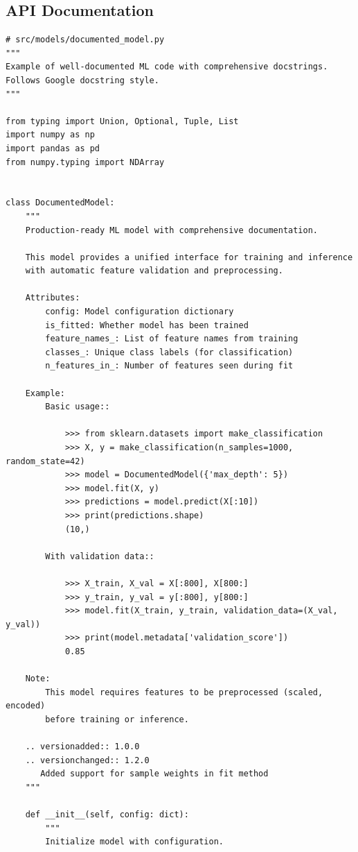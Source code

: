 \subsection{API Documentation}

\begin{lstlisting}[style=python, caption=Comprehensive docstring examples]
# src/models/documented_model.py
"""
Example of well-documented ML code with comprehensive docstrings.
Follows Google docstring style.
"""

from typing import Union, Optional, Tuple, List
import numpy as np
import pandas as pd
from numpy.typing import NDArray


class DocumentedModel:
    """
    Production-ready ML model with comprehensive documentation.

    This model provides a unified interface for training and inference
    with automatic feature validation and preprocessing.

    Attributes:
        config: Model configuration dictionary
        is_fitted: Whether model has been trained
        feature_names_: List of feature names from training
        classes_: Unique class labels (for classification)
        n_features_in_: Number of features seen during fit

    Example:
        Basic usage::

            >>> from sklearn.datasets import make_classification
            >>> X, y = make_classification(n_samples=1000, random_state=42)
            >>> model = DocumentedModel({'max_depth': 5})
            >>> model.fit(X, y)
            >>> predictions = model.predict(X[:10])
            >>> print(predictions.shape)
            (10,)

        With validation data::

            >>> X_train, X_val = X[:800], X[800:]
            >>> y_train, y_val = y[:800], y[800:]
            >>> model.fit(X_train, y_train, validation_data=(X_val, y_val))
            >>> print(model.metadata['validation_score'])
            0.85

    Note:
        This model requires features to be preprocessed (scaled, encoded)
        before training or inference.

    .. versionadded:: 1.0.0
    .. versionchanged:: 1.2.0
       Added support for sample weights in fit method
    """

    def __init__(self, config: dict):
        """
        Initialize model with configuration.


\end{lstlisting}
